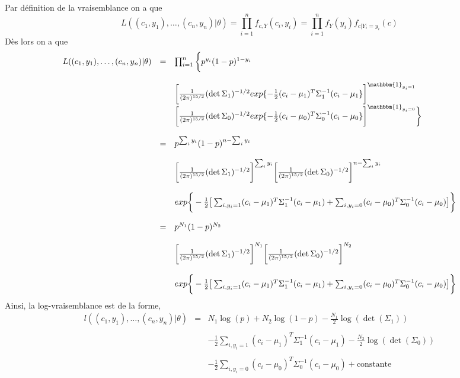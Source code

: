 \documentclass[10pt,a4paper]{report}\usepackage[]{graphicx}\usepackage[]{color}
\begin{document}
\noindent Par d\'efinition de la vraisemblance on a que 
$$
L((c_1,y_1),\hdots,(c_n,y_n)|\theta) = \prod_{i=1}^n f_{c,Y}(c_i,y_i) = \prod_{i=1}^n f_{Y}(y_i)f_{c|Y_i=y_i}(c)
$$
D\`es lors on a que 
$$
\begin{array}{rcl}
L((c_1,y_1),\hdots,(c_n,y_n)|\theta) & = &  \prod_{i=1}^n \bigg{\{}p^{y_i}(1-p)^{1-y_i} \\ \\
& & \bigg{[}\frac{1}{(2\pi)^{15/2}}(\det\Sigma_1)^{-1/2}exp\{-\frac{1}{2}(c_i-\mu_1)^T\Sigma_1^{-1} (c_i-\mu_1\}\bigg{]}^{\mathbbm{1}_{y_i=1}}  \\
& & \bigg{[}\frac{1}{(2\pi)^{15/2}}(\det\Sigma_0)^{-1/2}exp\{-\frac{1}{2}(c_i-\mu_0)^T\Sigma_0^{-1} (c_i-\mu_0\}\bigg{]}^{\mathbbm{1}_{y_i=0}} \bigg{\}} \\ \\
& = & p^{\sum_i y_i}(1-p)^{n-\sum_i y_i}\\ \\
& & \bigg{[}\frac{1}{(2\pi)^{15/2}}(\det\Sigma_1)^{-1/2}\bigg{]}^{\sum_i y_i}\bigg{[}\frac{1}{(2\pi)^{15/2}}(\det\Sigma_0)^{-1/2}\bigg{]}^{n-\sum_i y_i} \\ \\
& & exp\bigg{\{}-\frac{1}{2}\big{[}\sum_{i,y_i = 1}(c_i-\mu_1)^T\Sigma_1^{-1} (c_i-\mu_1)+\sum_{i,y_i = 0}(c_i-\mu_0)^T\Sigma_0^{-1} (c_i-\mu_0)\big{]}\bigg{\}} \\ \\
& = & p^{N_1}(1-p)^{N_2}\\ \\
& & \bigg{[}\frac{1}{(2\pi)^{15/2}}(\det\Sigma_1)^{-1/2}\bigg{]}^{N_1}\bigg{[}\frac{1}{(2\pi)^{15/2}}(\det\Sigma_0)^{-1/2}\bigg{]}^{N_2} \\ \\
& & exp\bigg{\{}-\frac{1}{2}\big{[}\sum_{i,y_i = 1}(c_i-\mu_1)^T\Sigma_1^{-1} (c_i-\mu_1)+\sum_{i,y_i = 0}(c_i-\mu_0)^T\Sigma_0^{-1} (c_i-\mu_0)\big{]}\bigg{\}} \\
\end{array}
$$
Ainsi, la log-vraisemblance est de la forme,
\begin{equation}
\begin{array}{rcl}
l((c_1,y_1),\hdots,(c_n,y_n)|\theta) & = & \displaystyle{N_1 \log(p) + N_2 \log(1-p) - \frac{N_1}{2}\log(\det(\Sigma_1))}\\ \\
& & \displaystyle{- \frac{1}{2}\sum_{i,y_i = 1}(c_i-\mu_1)^T \Sigma_1^{-1}(c_i-\mu_1) - \frac{N_2}{2}\log(\det(\Sigma_0))} \\ \\
& & \displaystyle{-\frac{1}{2}\sum_{i,y_i = 0}(c_i-\mu_0)^T \Sigma_0^{-1}(c_i-\mu_0) + \mbox{constante}}
\end{array}
\end{equation}
\end{document}
